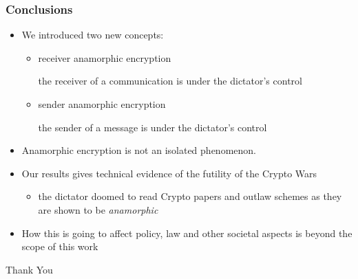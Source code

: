 \documentclass[]{beamer}
\begin{document}
\begin{frame}
\frametitle{Conclusions}
\begin{itemize}
\item We introduced two new concepts:
    \begin{itemize}
        \item {\color{purple} receiver anamorphic encryption} 

         the {\color{teal} receiver} of a communication is under 
        the dictator's control

        \item {\color{purple} sender anamorphic encryption} 

         the {\color{teal} sender} of a message is under 
        the dictator's control

    \end{itemize}
\item {\color{purple} Anamorphic encryption} is 
{\color{teal} not an isolated phenomenon}. 
\item Our results gives {\color{teal} technical} 
evidence of the {\color{teal} futility} of the
{\color{purple} Crypto Wars}
    \begin{itemize}
        \item the dictator doomed to read Crypto papers and outlaw schemes
                as they are shown to be {\color{purple} \em anamorphic}
    \end{itemize}
\item How this is going to affect policy, law and other societal aspects
    is beyond the scope of this work
\end{itemize}
\end{frame}



\begin{frame}
\vfill

\begin{center}
{\huge\color{teal} Thank You}
\end{center}

\vfill
\end{frame}
\end{document}
